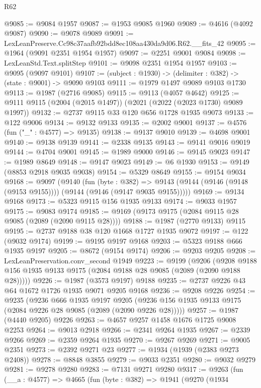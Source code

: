 \begin{lexlean}{R62}
\begin{coremodule}
@9085 := @9084 @1957
@9087 := @1953 @9085 @1960
@9089 := @4616 (@4092 @9087)
@9090 := @9078 @9089
@9091 := LexLeanPreserve.Cc98c37aafb92bdd8ec108aa430da9d06.R62.__fits_42
@9095 := @1964 (@9091 @2351 @1954 @1957)
@9097 := @2251 @9001 @9084
@9098 := LexLeanStd.Text.splitStep
@9101 := @9098 @2351 @1954 @1957
@9103 := @9095 (@9097 @9101)
@9107 := (subject : @1930) -> (delimiter : @382) -> (state : @9001) -> @9090 @9103
@9111 := @1979 @1497 @9089 @9103 @1730
@9113 := @1987 (@2716 @9085)
@9115 := @9113 (@4057 @4642)
@9125 := @9111 @9115 (@2004 (@2015 @1497)) (@2021 (@2022 (@2023 @1730) @9089 @1997))
@9132 := @2737 @9115 @33 @120 @656 @1728 @1935 @9073
@9133 := @122 @9006
@9134 := @9132 @9133
@9135 := @2002 @9001
@9137 := @4576 (fun ("_" : @4577) => @9135)
@9138 := @9137 @9010
@9139 := @4698 @9001
@9140 := @9138 @9139
@9141 := @2338 @9135
@9143 := @9141 @9016 @9019
@9144 := @4704 @9001
@9145 := @1989 @9000
@9146 := @9145 @9023
@9147 := @1989 @8649
@9148 := @9147 @9023
@9149 := @6 @1930
@9153 := @9149 (@8853 @2918 @9035 @9038)
@9154 := @5329 @8649
@9155 := @9154 @9034
@9168 := @9097
    (@9140
      (fun (byte : @382) =>
      @9143 (@9144 (@9146 (@9148 (@9153 @9155)))) (@9144 (@9146 (@9147 @9035 @9155)))))
@9169 := @9134 @9168
@9173 := @5323 @9115 @156 @1935 @9133
@9174 := @9033 @1957
@9175 := @9083 @9174
@9185 := @9169 (@9173 @9175 (@2084 @9115 @28 @9085 (@2089 (@2090 @9115 @28))))
@9188 := @1987 (@2770 @9133) @9115
@9195 := @2737 @9188 @38 @120 @1668 @1727 @1935 @9072
@9197 := @122 (@9032 @9174)
@9199 := @9195 @9197 @9168
@9203 := @5323 @9188 @666 @1935 @9197
@9205 := @8672 (@9154 @9174)
@9206 := @9203 @9205
@9208 := LexLeanPreservation.conv_second @1949
@9223 := @9199
    (@9206 (@9208 @9188 @156 @1935 @9133 @9175 (@2084 @9188 @28 @9085 (@2089 (@2090 @9188 @28)))))
@9226 := @1987 (@3573 @9197) @9188
@9235 := @2737 @9226 @43 @64 @1672 @1726 @1935 @9071 @9205 @9168
@9236 := @9208 @9226
@9254 := @9235
    (@9236
      @666
      @1935
      @9197
      @9205
      (@9236 @156 @1935 @9133 @9175 (@2084 @9226 @28 @9085 (@2089 (@2090 @9226 @28)))))
@9257 := @1987 (@4440 @9205) @9226
@9263 := @4657 @9257 @1458 @1676 @1725 @9008 @2253
@9264 := @9013 @2918
@9266 := @2341 @9264 @1935
@9267 := @2339 @9266
@9269 := @2359 @9264 @1935
@9270 := @9267 @9269
@9271 := @9005 @2351
@9273 := @2392 @9271 @23
@9277 := @1934 (@1939 (@2383 @9273 @2408))
@9278 := @8848 @3855
@9279 := @9033 @2351
@9280 := @9032 @9279
@9281 := @9278 @9280
@9283 := @7131 @9271 @9280
@9317 := @9263
    (fun (__a : @4577) =>
    @4665
      (fun (byte : @382) =>
      @1941
        (@9270
          (@1934

\end{coremodule}
\end{lexlean}
